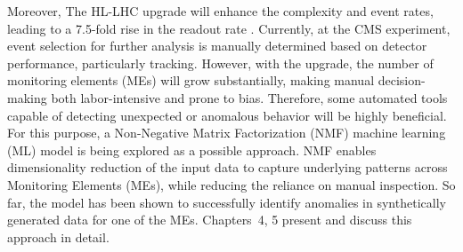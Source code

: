 Moreover, The HL-LHC upgrade will enhance the complexity and event rates, leading to a 7.5-fold rise in the readout rate \cite{Fernandez_Perez_Tomei_2020}. Currently, at the CMS experiment, event selection for further analysis is manually determined based on detector performance, particularly tracking. However, with the upgrade, the number of monitoring elements (MEs) will grow substantially, making manual decision-making both labor-intensive and prone to bias. Therefore, some automated tools capable of detecting unexpected or anomalous behavior will be highly beneficial. For this purpose, a Non-Negative Matrix Factorization (NMF) machine learning (ML) model is being explored as a possible approach. NMF enables dimensionality reduction of the input data to capture underlying patterns across Monitoring Elements (MEs), while reducing the reliance on manual inspection. So far, the model has been shown to successfully identify anomalies in synthetically generated data for one of the MEs. Chapters~4, 5 present and discuss this approach in detail.
